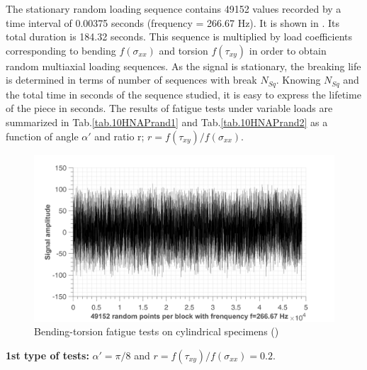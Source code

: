 The stationary random loading sequence contains 49152 values recorded by a time interval of 0.00375 seconds (frequency = 266.67 Hz). It is shown in . Its total duration is 184.32 seconds. This sequence is multiplied by load coefficients corresponding to bending $f (\sigma_{xx})$ and torsion $f (\tau_{xy})$ in order to obtain random multiaxial loading sequences. As the signal is stationary, the breaking life is determined in terms of number of sequences with break $N_{Sq}$. Knowing $N_{Sq}$ and the total time in seconds of the sequence studied, it is easy to express the lifetime of the piece in seconds. The results of fatigue tests under variable loads are summarized in Tab.\ref{tab.10HNAPrand1} and Tab.\ref{tab.10HNAPrand2} as a function of angle $\alpha'$ and ratio r; $r =f(\tau_{xy})/f(\sigma_{xx})$.
\begin{figure}[!h]
\centering
\includegraphics[width=\textwidth]{figures//10HNAPrandomblock.png} 
\caption{Bending-torsion fatigue tests on cylindrical specimens (\cite{carpinteri2003multiaxial})}
\label{fig.10HNAPrandom}
\end{figure}

\textbf{1st type of tests:} $\alpha' = \pi / 8$ and $r =f(\tau_{xy})/f(\sigma_{xx})=0.2$.

